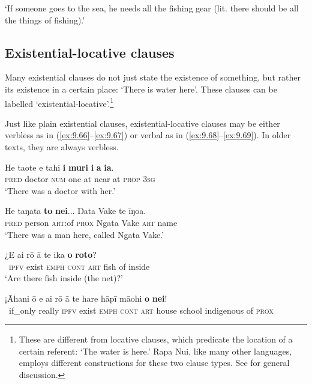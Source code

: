 \glt 
‘If someone goes to the sea, he needs all the fishing gear (lit. there should be all the things of fishing).’ \textstyleExampleref{[R354.002]} 
\z

\newpage 
\subsection{Existential-locative clauses}\label{sec:9.3.2}
Many existential clauses do not just state the existence of something, but rather its existence in a certain place: ‘There is water here’. These clauses can be labelled ‘existential-locative’.\footnote{\label{fn:474}These are different from locative clauses, which predicate the location of a certain referent: ‘The water is here.’ Rapa Nui, like many other languages, employs different constructions for these two clause types. See \citet[241]{Dryer2007Clause} for general discussion.} 

Just like plain existential clauses, existential-locative clauses may be either verbless as in (\ref{ex:9.66}–\ref{ex:9.67}) or verbal as in (\ref{ex:9.68}–\ref{ex:9.69}). In older texts, they are always verbless.

\ea\label{ex:9.66}
\gll He taote e tahi \textbf{{\ꞌ}i} \textbf{muri} \textbf{i} \textbf{a} \textbf{ia}. \\
\textsc{pred} doctor \textsc{num} one at near at \textsc{prop} \textsc{3sg} \\

\glt 
‘There was a doctor with her.’ \textstyleExampleref{[R210.090]} 
\z

\ea\label{ex:9.67}
\gll He taŋata \textbf{to} \textbf{nei}... Ŋata Vake te {\ꞌ}īŋoa.\\
\textsc{pred} person \textsc{art}:of \textsc{prox} Ngata Vake \textsc{art} name\\

\glt 
‘There was a man here, called Ngata Vake.’ \textstyleExampleref{[Ley-3-02.002]}
\z

\ea\label{ex:9.68}
\gll ¿E ai rō {\ꞌ}ā te ika \textbf{o} \textbf{roto}? \\
~\textsc{ipfv} exist \textsc{emph} \textsc{cont} \textsc{art} fish of inside \\

\glt 
‘Are there fish inside (the net)?’ \textstyleExampleref{[R241.058]} 
\z

\ea\label{ex:9.69}
\gll ¡{\ꞌ}Āhani {\ꞌ}ō e ai rō {\ꞌ}ā te hare hāpī mā{\ꞌ}ohi \textbf{o} \textbf{nei}! \\
~if\_only really \textsc{ipfv} exist \textsc{emph} \textsc{cont} \textsc{art} house school indigenous of \textsc{prox} \\

